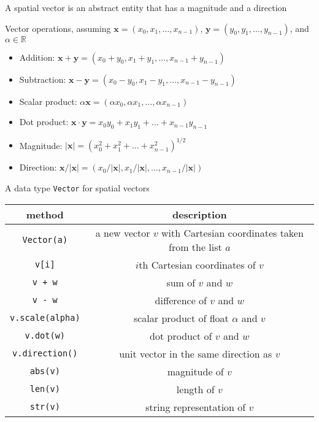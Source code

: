 \documentclass[8pt,a4paper,compress]{beamer}
\begin{document}
\begin{frame}[fragile]
\pause

A spatial vector is an abstract entity that has a magnitude and a direction

\pause
\bigskip

Vector operations, assuming $\mathbf{x}=(x_0,x_1,\dots,x_{n-1})$, $\mathbf{y}=(y_0,y_1,\dots,y_{n-1})$, and $\alpha \in \mathbb{R}$
\begin{itemize}
\item Addition: $\mathbf{x}+\mathbf{y}=(x_0+y_0,x_1+y_1,\dots,x_{n-1}+y_{n-1})$
\item Subtraction: $\mathbf{x}-\mathbf{y}=(x_0-y_0,x_1-y_1,\dots,x_{n-1}-y_{n-1})$
\item Scalar product: $\alpha\mathbf{x}=(\alpha x_0,\alpha x_1,\dots,\alpha x_{n-1})$
\item Dot product: $\mathbf{x}\cdot\mathbf{y}=x_0y_0+x_1y_1+\dots+x_{n-1}y_{n-1}$
\item Magnitude: $|\mathbf{x}|=(x_0^2+x_1^2+\dots+x_{n-1}^2)^{1/2}$
\item Direction: $\mathbf{x}/|\mathbf{x}|=(x_0/|\mathbf{x}|,x_1/|\mathbf{x}|,\dots,x_{n-1}/|\mathbf{x}|)$
\end{itemize}
\end{frame}

\begin{frame}[fragile]
\pause

A data type \lstinline{Vector} for spatial vectors
\begin{center}
\begin{tabular}{cc}
method & description \\ \hline
\lstinline$Vector(a)$ & a new vector $v$ with Cartesian coordinates taken from the list $a$ \\
\lstinline$v[i]$ & $i$th Cartesian coordinates of $v$ \\
\lstinline$v + w$ & sum of $v$ and $w$ \\
\lstinline$v - w$ & difference of $v$ and $w$ \\
\lstinline$v.scale(alpha)$ & scalar product of float $\alpha$ and $v$ \\
\lstinline$v.dot(w)$ & dot product of $v$ and $w$ \\
\lstinline$v.direction()$ & unit vector in the same direction as $v$ \\
\lstinline$abs(v)$ & magnitude of $v$ \\
\lstinline$len(v)$ & length of $v$ \\
\lstinline$str(v)$ & string representation of $v$
\end{tabular} 
\end{center}
\end{frame}
\end{document}
